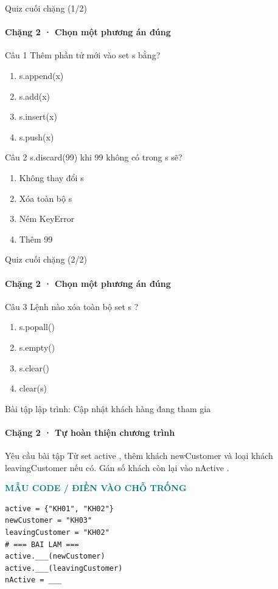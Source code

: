 \documentclass[aspectratio=169,10pt]{beamer}
\begin{document}
\begin{frame}[t]{Quiz cuối chặng (1/2)}
\framesubtitle{Chặng 2 · Chọn một phương án đúng}
\small
\begin{block}{Câu 1}
Thêm phần tử mới vào set s bằng?\par\smallskip
\begin{enumerate}
\item s.append(x)
\item s.add(x)
\item s.insert(x)
\item s.push(x)
\end{enumerate}
\end{block}
\begin{block}{Câu 2}
s.discard(99) khi 99 không có trong s sẽ?\par\smallskip
\begin{enumerate}
\item Không thay đổi s
\item Xóa toàn bộ s
\item Ném KeyError
\item Thêm 99
\end{enumerate}
\end{block}

\end{frame}

\begin{frame}[t]{Quiz cuối chặng (2/2)}
\framesubtitle{Chặng 2 · Chọn một phương án đúng}
\small
\begin{block}{Câu 3}
Lệnh nào xóa toàn bộ set s ?\par\smallskip
\begin{enumerate}
\item s.popall()
\item s.empty()
\item s.clear()
\item clear(s)
\end{enumerate}
\end{block}

\end{frame}

\begin{frame}[fragile,t]{Bài tập lập trình: Cập nhật khách hàng đang tham gia}
\framesubtitle{Chặng 2 · Tự hoàn thiện chương trình}
\begin{block}{Yêu cầu bài tập}
Từ set active , thêm khách newCustomer và loại khách leavingCustomer nếu có. Gán số khách còn lại vào nActive .
\end{block}
\textcolor{teal}{\scriptsize\textbf{MẪU CODE / ĐIỀN VÀO CHỖ TRỐNG}}\par
\begin{Verbatim}[fontsize=\scriptsize,frame=single,framesep=3mm,rulecolor=\color{teal!35},breaklines=true]
active = {"KH01", "KH02"}
newCustomer = "KH03"
leavingCustomer = "KH02"
# === BAI LAM ===
active.___(newCustomer)
active.___(leavingCustomer)
nActive = ___
\end{Verbatim}
\end{frame}
\end{document}
